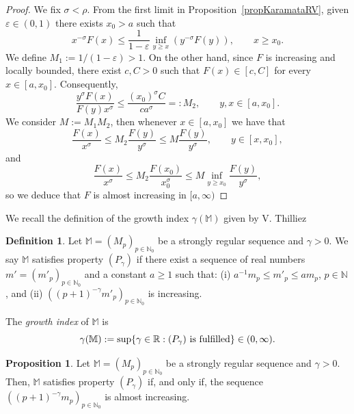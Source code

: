 \documentclass[11pt,a4paper]{article}
\theoremstyle{definition}
\newtheorem{pro}[theo]{Proposition}
\newtheorem{defi}[theo]{Definition}
\newenvironment{prop}{\smallskip\begin{pro}}{\end{pro}\smallskip}
\def\oo{\infty}
\def\ri{\rightarrow}
\def\ep{\varepsilon}
\def\ga{\gamma}
\def\ro{\rho}
\def\N{\mathbb{N}}
\def\R{\mathbb{R}}
\def\M{\mathbb{M}}
\def\bM{\mathbb{M}}%
\begin{document}
\begin{proof}
 We fix $\sigma<\ro$. From the first limit in Proposition~\ref{propKaramataRV},
given $\ep\in(0,1)$ there exists $x_0>a$ such that
$${ x^{-\sigma} F(x)}\leq \frac{1}{1-\ep} \inf_{y\geq x} (y^{-\sigma} F(y)), \qquad x\geq x_0.  $$
We define $M_1:=1/(1-\ep)>1$. On the other hand, since $F$ is increasing and locally bounded, there exist $c,C>0$ such that $F(x)\in[c,C]$ for every $x\in[a,x_0]$. Consequently,
$$ \frac{y^\sigma F(x)}{F(y) x^\sigma } \leq \frac{(x_0)^\sigma C}{c a^\sigma}=:M_2,\qquad y,x\in[a,x_0].$$
We consider $M:=M_1M_2$, then whenever $x\in[a,x_0]$ we have that
$$
 \frac{F(x)}{x^\sigma}\leq M_2 \frac{F(y)}{y^\sigma} \leq M \frac{F(y)}{y^\sigma}, \qquad y\in[x,x_0],
 $$
 and
 $$
  \frac{F(x)}{x^\sigma}\leq M_2 \frac{F(x_0)}{x_0^\sigma} \leq M \inf_{y\geq x_0} \frac{F(y)}{y^\sigma},
  $$
so we deduce that $F$ is almost increasing in $[a,\oo)$
\end{proof}

We recall the definition of the growth index $\gamma(\M)$ given  by V. Thilliez

\begin{defi}
Let $\bM=(M_{p})_{p\in\N_{0}}$ be a strongly regular sequence and $\ga>0$. We say $\bM$ satisfies property
$\left(P_{\ga}\right)$  if there exist a sequence of real numbers $m'=(m'_{p})_{p\in\N_0}$ and a
constant $a\ge1$ such that: (i) $a^{-1}m_{p}\le m'_{p}\le am_{p}$, $p\in\N$, and (ii) $\left((p+1)^{-\ga}m'_{p}\right)_{p\in\N_0}$
is increasing.

The \textit{growth index} of $\bM$ is
$$\ga(\bM):=\sup\{\ga\in\R:(P_{\ga})\hbox{ is fulfilled}\}\in(0,\infty).$$
\end{defi}

\begin{prop}\label{pro.pgamma.almostincreasing}
Let $\bM=(M_{p})_{p\in\N_{0}}$ be a strongly regular sequence and $\ga>0$. Then, $\bM$ satisfies property
$\left(P_{\ga}\right)$  if, and only if, the sequence $\left((p+1)^{-\ga}m_{p}\right)_{p\in\N_0}$ is almost increasing.
\end{prop}
\end{document}
